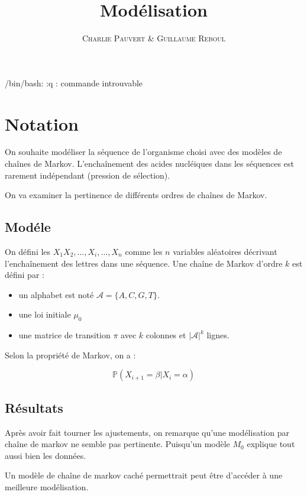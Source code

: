 \documentclass[12pt,a4paper]{article}
\title{Modélisation}
\author{\textsc{Charlie Pauvert} \& \textsc{Guillaume Reboul}}
\begin{document}
/bin/bash: :q : commande introuvable
\section{Notation }

On souhaite modéliser la séquence de l'organisme choisi avec des modèles de chaînes de Markov. 
L'enchaînement des acides nucléiques dans les séquences est rarement indépendant (pression de sélection).

On va examiner la pertinence de différents ordres de chaînes de Markov. 


\subsection{Modéle}

On défini les $X_1X_2, \dots, X_i, \dots, X_n$ comme les $n$ variables aléatoires décrivant l'enchaînement des lettres dans une séquence.
Une chaîne de Markov d'ordre $k$ est défini par : 

\begin{itemize}
\item un alphabet est noté $\mathcal{A} = \{A,C,G,T\}$.
\item une loi initiale $\mu_0$
\item une matrice de transition $\pi$ avec $k$ colonnes et $|\mathcal{A}|^k$ lignes.
\end{itemize}

Selon la propriété de Markov, on a  : 

\[
\mathbb{P}(X_{i+1} = \beta | X_i = \alpha ) 
\]


\subsection{Résultats}

Après avoir fait tourner les ajustements, on remarque qu'une modélisation par chaîne de markov ne semble pas pertinente.
Puisqu'un modèle $M_0$ explique tout aussi bien les données.


Un modèle de chaîne de markov caché permettrait peut être d'accéder à une meilleure modélisation.
\end{document}
